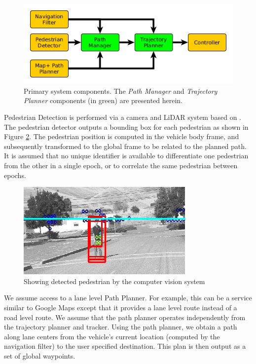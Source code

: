 \documentclass[letterpaper, 10 pt, conference]{ieeeconf}  %
\begin{document}
\begin{figure}[tb]
  \centering
  \includegraphics[width=1.0\columnwidth]{graphics/MissingReactionPiece2.png}
  \caption{
    Primary system components. The {\it Path Manager} and {\it Trajectory Planner} components (in green) are presented herein.
  }
  \label{fig:addreact}
\end{figure}

Pedestrian Detection is performed via a camera and LiDAR system based on \cite{Gepperth2013,Gepperth2014}.
The pedestrian detector outputs a bounding box for each pedestrian as shown in Figure \ref{fig:ped}.
The pedestrian position is computed in the vehicle body frame, and subsequently transformed to the global frame to be related to the planned path.
It is assumed that no unique identifier is available to differentiate one pedestrian from the other in a single epoch, or to correlate the same pedestrian between epochs.

\begin{figure}[tb]
  \centering
  \includegraphics[width=0.5\columnwidth]{graphics/ped3.png}
  \caption{Showing detected pedestrian by the computer vision system
  \newline
  }
  \label{fig:ped}
\end{figure}

We assume access to a lane level Path Planner. For example, this can be a service similar to Google Maps except that it provides a lane level route instead of a road level route. 
We assume that the path planner operates independently from the trajectory planner and tracker.
Using the path planner, we obtain a path along lane centers from the vehicle's current location (computed by the navigation filter) to the user specified destination.
This plan is then output as a set of global waypoints.
\end{document}
